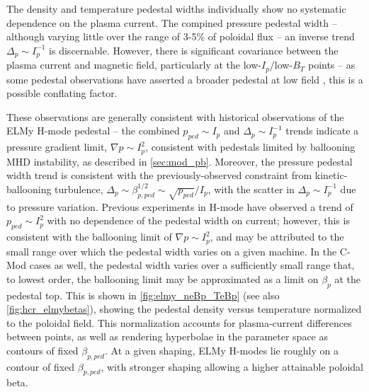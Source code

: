 The density and temperature pedestal widths individually show no systematic dependence on the plasma current.  The compined pressure pedestal width -- although varying little over the range of 3-5\% of poloidal flux -- an inverse trend $\Delta_p \sim I_p^{-1}$ is discernable.  However, there is significant covariance between the plasma current and magnetic field, particularly at the low-$I_p$/low-$B_T$ points -- as some pedestal observations have asserted a broader pedestal at low field \cite{Hughes2002}, this is a possible conflating factor.

These observations are generally consistent with historical observations of the ELMy H-mode pedestal -- the combined $p_{ped} \sim I_p$ and $\Delta_p \sim I_p^{-1}$ trends indicate a pressure gradient limit, $\nabla p \sim I_p^2$, consistent with pedestals limited by ballooning MHD instability, as described in \cref{sec:mod_pb}.  Moreover, the pressure pedestal width trend is consistent with the previously-observed constraint from kinetic-ballooning turbulence, $\Delta_p \sim \beta_{p,ped}^{1/2} \sim \sqrt{p_{ped}}/I_p$, with the scatter in $\Delta_p \sim I_p^{-1}$ due to pressure variation.  Previous experiments in H-mode have observed a trend of $p_{ped} \sim I_p^2$ with no dependence of the pedestal width on current; however, this is consistent with the ballooning limit of $\nabla p \sim I_p^2$, and may be attributed to the small range over which the pedestal width varies on a given machine.  In the C-Mod cases as well, the pedestal width varies over a sufficiently small range that, to lowest order, the ballooning limit may be approximated as a limit on $\beta_{p}$ at the pedestal top.  This is shown in \cref{fig:elmy_neBp_TeBp} (see also \cref{fig:hcr_elmybetas}), showing the pedestal density versus temperature normalized to the poloidal field.  This normalization accounts for plasma-current differences between points, as well as rendering hyperbolae in the parameter space as contours of fixed $\beta_{p,ped}$.  At a given shaping, ELMy H-modes lie roughly on a contour of fixed $\beta_{p,ped}$, with stronger shaping allowing a higher attainable poloidal beta.

